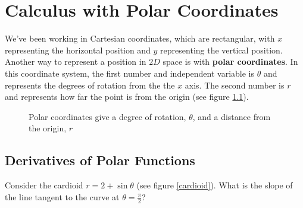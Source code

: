 \chapter{Calculus with Polar Coordinates}

We've been working in Cartesian coordinates, which are rectangular, with $x$ 
representing the horizontal position and $y$ representing the vertical 
position. Another way to represent a position in $2D$ space is with \textbf{
polar coordinates}. In this coordinate system, the 
first number and independent variable is $\theta$ and represents the degrees 
of rotation from the the $x$ axis. The second number is $r$ and represents how 
far the point is from the origin (see figure \ref{polarex}). 

\begin{figure}[htbp]
\centering
    \label{polarex}
    \caption{Polar coordinates give a degree of rotation, $\theta$, and a 
    distance from the origin, $r$}
    \end{figure}

\section{Derivatives of Polar Functions}
Consider the cardioid $r = 2 + \sin{\theta}$ (see figure \ref{cardioid}). What 
is the slope of the line tangent to the curve at $\theta = \frac{\pi}{2}$? 

